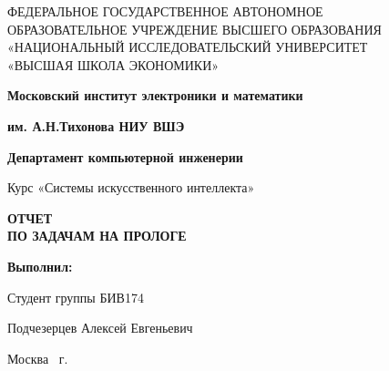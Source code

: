 \begin{titlepage}
    \begin{center}
        ФЕДЕРАЛЬНОЕ ГОСУДАРСТВЕННОЕ АВТОНОМНОЕ \\
        ОБРАЗОВАТЕЛЬНОЕ УЧРЕЖДЕНИЕ ВЫСШЕГО ОБРАЗОВАНИЯ\\
        «НАЦИОНАЛЬНЫЙ ИССЛЕДОВАТЕЛЬСКИЙ УНИВЕРСИТЕТ\\
        «ВЫСШАЯ ШКОЛА ЭКОНОМИКИ»
    \end{center}

    \begin{center}
        \textbf{Московский институт электроники и математики}

        \textbf{им. А.Н.Тихонова НИУ ВШЭ}

        \vspace{2ex}

        \textbf{Департамент компьютерной инженерии}
    \end{center}
    \vspace{1ex}

    \begin{center}
        Курс «Системы искусственного интеллекта»
    \end{center}


    \begin{center}
        \textbf{ОТЧЕТ\\
        ПО ЗАДАЧАМ НА ПРОЛОГЕ
        }
    \end{center}


    \vspace{30ex}

    \begin{flushright}
        \textbf{Выполнил:}

        \vspace{2ex}

        Студент группы БИВ174

        \vspace{2ex}

        Подчезерцев Алексей Евгеньевич


    \end{flushright}

    \vfill
    \begin{center}
        Москва \the\year \, г.
    \end{center}

\end{titlepage}
\addtocounter{page}{1}